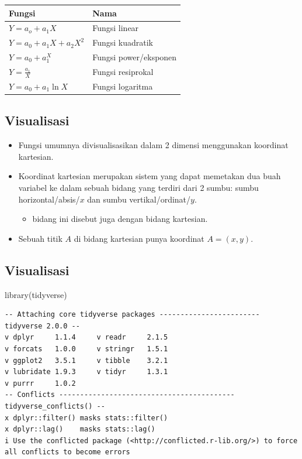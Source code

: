 \documentclass[
  letterpaper,
  DIV=11,
  numbers=noendperiod]{scrartcl}
\newenvironment{Shaded}{\begin{snugshade}}{\end{snugshade}}
\newcommand{\FunctionTok}[1]{\textcolor[rgb]{0.28,0.35,0.67}{#1}}
\newcommand{\NormalTok}[1]{\textcolor[rgb]{0.00,0.23,0.31}{#1}}
\providecommand{\tightlist}{%
  \setlength{\itemsep}{0pt}\setlength{\parskip}{0pt}}\usepackage{longtable,booktabs,array}
\begin{document}
\begin{longtable}[]{@{}ll@{}}
\toprule\noalign{}
Fungsi & Nama \\
\midrule\noalign{}
\endhead
\bottomrule\noalign{}
\endlastfoot
\(Y=a_o+a_1X\) & Fungsi linear \\
\(Y=a_0+a_1X+a_2X^2\) & Fungsi kuadratik \\
\(Y=a_0+a_1^X\) & Fungsi power/eksponen \\
\(Y=\frac{a_1}{X}\) & Fungsi resiprokal \\
\(Y=a_0+a_1 \ln X\) & Fungsi logaritma \\
\end{longtable}

\hypertarget{visualisasi}{%
\subsection{Visualisasi}\label{visualisasi}}

\begin{itemize}
\item
  Fungsi umumnya divisualisasikan dalam 2 dimensi menggunakan koordinat
  kartesian.
\item
  Koordinat kartesian merupakan sistem yang dapat memetakan dua buah
  variabel ke dalam sebuah bidang yang terdiri dari 2 sumbu: sumbu
  horizontal/absis/\(x\) dan sumbu vertikal/ordinat/\(y\).

  \begin{itemize}
  \tightlist
  \item
    bidang ini disebut juga dengan bidang kartesian.
  \end{itemize}
\item
  Sebuah titik \(A\) di bidang kartesian punya koordinat \(A=(x,y)\).
\end{itemize}

\hypertarget{visualisasi-1}{%
\subsection{Visualisasi}\label{visualisasi-1}}

\begin{Shaded}
\begin{Highlighting}[]
\FunctionTok{library}\NormalTok{(tidyverse)}
\end{Highlighting}
\end{Shaded}

\begin{verbatim}
-- Attaching core tidyverse packages ------------------------ tidyverse 2.0.0 --
v dplyr     1.1.4     v readr     2.1.5
v forcats   1.0.0     v stringr   1.5.1
v ggplot2   3.5.1     v tibble    3.2.1
v lubridate 1.9.3     v tidyr     1.3.1
v purrr     1.0.2     
-- Conflicts ------------------------------------------ tidyverse_conflicts() --
x dplyr::filter() masks stats::filter()
x dplyr::lag()    masks stats::lag()
i Use the conflicted package (<http://conflicted.r-lib.org/>) to force all conflicts to become errors
\end{verbatim}
\end{document}
